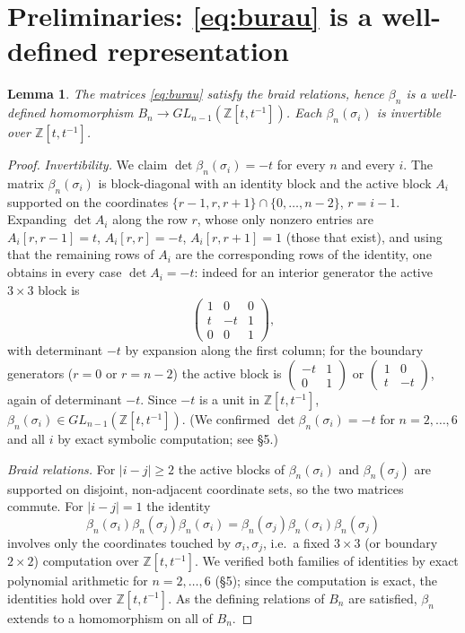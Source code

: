 \documentclass{amsart}
\newtheorem{lemma}{Lemma}
\theoremstyle{remark}
\begin{document}
\section{Preliminaries: \texorpdfstring{\eqref{eq:burau}}{(1)} is a well-defined representation}

\begin{lemma}\label{lem:rep}
The matrices \eqref{eq:burau} satisfy the braid relations, hence
$\beta_n$ is a well-defined homomorphism $B_n\to GL_{n-1}(\mathbb Z[t,t^{-1}])$.
Each $\beta_n(\sigma_i)$ is invertible over $\mathbb Z[t,t^{-1}]$.
\end{lemma}

\begin{proof}
\emph{Invertibility.} We claim $\det\beta_n(\sigma_i)=-t$ for every $n$ and
every $i$. The matrix $\beta_n(\sigma_i)$ is block-diagonal with an identity
block and the active block $A_i$ supported on the coordinates
$\{r-1,r,r+1\}\cap\{0,\dots,n-2\}$, $r=i-1$. Expanding $\det A_i$ along the row
$r$, whose only nonzero entries are $A_i[r,r-1]=t$, $A_i[r,r]=-t$,
$A_i[r,r+1]=1$ (those that exist), and using that the remaining rows of $A_i$ are
the corresponding rows of the identity, one obtains in every case
$\det A_i=-t$: indeed for an interior generator the active $3\times3$ block is
\[
\begin{pmatrix}1&0&0\\ t&-t&1\\ 0&0&1\end{pmatrix},
\]
with determinant $-t$ by expansion along the first column; for the boundary
generators ($r=0$ or $r=n-2$) the active block is
$\left(\begin{smallmatrix}-t&1\\0&1\end{smallmatrix}\right)$ or
$\left(\begin{smallmatrix}1&0\\ t&-t\end{smallmatrix}\right)$, again of
determinant $-t$. Since $-t$ is a unit in $\mathbb Z[t,t^{-1}]$,
$\beta_n(\sigma_i)\in GL_{n-1}(\mathbb Z[t,t^{-1}])$. (We confirmed
$\det\beta_n(\sigma_i)=-t$ for $n=2,\dots,6$ and all $i$ by exact symbolic
computation; see \S5.)

\emph{Braid relations.} For $|i-j|\ge2$ the active blocks of
$\beta_n(\sigma_i)$ and $\beta_n(\sigma_j)$ are supported on disjoint,
non-adjacent coordinate sets, so the two matrices commute. For $|i-j|=1$ the
identity
\[
\beta_n(\sigma_i)\beta_n(\sigma_j)\beta_n(\sigma_i)
=\beta_n(\sigma_j)\beta_n(\sigma_i)\beta_n(\sigma_j)
\]
involves only the coordinates touched by $\sigma_i,\sigma_j$, i.e.\ a fixed
$3\times3$ (or boundary $2\times2$) computation over $\mathbb Z[t,t^{-1}]$. We
verified both families of identities by exact polynomial arithmetic for
$n=2,\dots,6$ (\S5); since the computation is exact, the identities hold over
$\mathbb Z[t,t^{-1}]$. As the defining relations of $B_n$ are satisfied,
$\beta_n$ extends to a homomorphism on all of $B_n$.
\end{proof}
\end{document}
